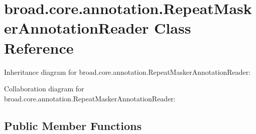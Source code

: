 \hypertarget{classbroad_1_1core_1_1annotation_1_1_repeat_masker_annotation_reader}{\section{broad.\+core.\+annotation.\+Repeat\+Masker\+Annotation\+Reader Class Reference}
\label{classbroad_1_1core_1_1annotation_1_1_repeat_masker_annotation_reader}
}


Inheritance diagram for broad.\+core.\+annotation.\+Repeat\+Masker\+Annotation\+Reader\+:


Collaboration diagram for broad.\+core.\+annotation.\+Repeat\+Masker\+Annotation\+Reader\+:
\subsection*{Public Member Functions}
